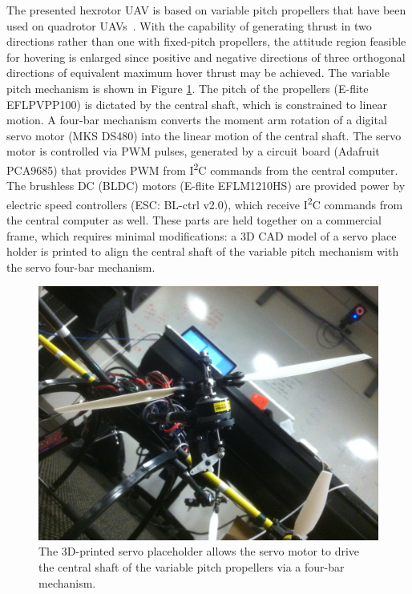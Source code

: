 \documentclass[twocolumn,letterpaper]{IEEEAerospaceCLS}  %
\begin{document}
The presented hexrotor UAV is based on variable pitch propellers that have been used on quadrotor UAVs~\cite{CutUreMicHow11,CutHow12}. With the capability of generating thrust in two directions rather than one with fixed-pitch propellers, the attitude region feasible for hovering is enlarged since positive and negative directions of three orthogonal directions of equivalent maximum hover thrust may be achieved. The variable pitch mechanism is shown in Figure \ref{VarPitchMech}.
The pitch of the propellers (E-flite EFLPVPP100) is dictated by the central shaft, which is constrained to linear motion.
A four-bar mechanism converts the moment arm rotation of a digital servo motor (MKS DS480) into the linear motion of the central shaft. The servo motor is controlled via PWM pulses, generated by a circuit board (Adafruit PCA9685) that provides PWM from I\textsuperscript{2}C commands from the central computer. The brushless DC (BLDC) motors (E-flite EFLM1210HS) are provided power by electric speed controllers (ESC: BL-ctrl v2.0), which receive I\textsuperscript{2}C commands from the central computer as well.
These parts are held together on a commercial frame, which requires minimal modifications: a 3D CAD model of a servo place holder is printed to align the central shaft of the variable pitch mechanism with the servo four-bar mechanism.

\begin{figure}
\centerline{
	\includegraphics[width=0.85\columnwidth]{VarPitchMech}}
\caption{The 3D-printed servo placeholder allows the servo motor to drive the central shaft of the variable pitch propellers via a four-bar mechanism.}
\label{VarPitchMech}
\end{figure}
\end{document}
